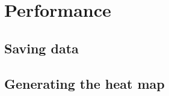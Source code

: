 \section{Performance}
\label{Performance}

\subsection{Saving data}
\label{Performance_Saving}

\subsection{Generating the heat map}
\label{Performance_Generating}
